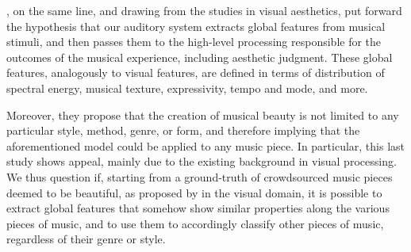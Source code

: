 \cite{brattico2017global}, on the same line, and drawing from the studies in visual aesthetics, put forward the hypothesis that our auditory system extracts global features from musical stimuli, and then passes them to the high-level processing responsible for the outcomes of the musical experience, including aesthetic judgment. These global features, analogously to visual features, are defined in terms of distribution of spectral energy, musical texture, expressivity, tempo and mode, and more.

Moreover, they propose that the creation of musical beauty is not limited to any particular style, method, genre, or form, and therefore implying that the aforementioned model could be applied to any music piece. In particular, this last study shows appeal, mainly due to the existing background in visual processing. We thus question if, starting from a ground-truth of crowdsourced music pieces deemed to be beautiful, as proposed by \citeauthor{schifanella2015image} in the visual domain, it is possible to extract global features that somehow show similar properties along the various pieces of music, and to use them to accordingly classify other pieces of music, regardless of their genre or style.

